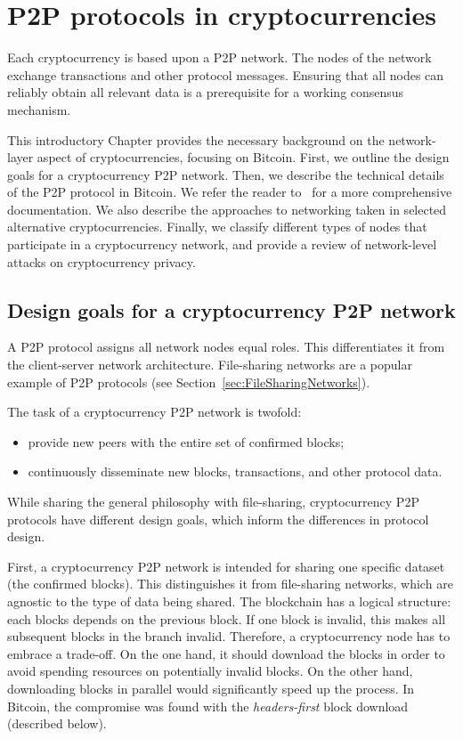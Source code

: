 \chapter{P2P protocols in cryptocurrencies}

\label{Chapter02IntroP2P}

Each cryptocurrency is based upon a P2P network.
The nodes of the network exchange transactions and other protocol messages.
Ensuring that all nodes can reliably obtain all relevant data is a prerequisite for a working consensus mechanism.

This introductory Chapter provides the necessary background on the network-layer aspect of cryptocurrencies, focusing on Bitcoin.
First, we outline the design goals for a cryptocurrency P2P network.
Then, we describe the technical details of the P2P protocol in Bitcoin.
We refer the reader to~\cite{BitcoinWiki, Garay2015} for a more comprehensive documentation.
We also describe the approaches to networking taken in selected alternative cryptocurrencies.
Finally, we classify different types of nodes that participate in a cryptocurrency network, and provide a review of network-level attacks on cryptocurrency privacy.


\section{Design goals for a cryptocurrency P2P network}

A P2P protocol assigns all network nodes equal roles.
This differentiates it from the client-server network architecture.
File-sharing networks are a popular example of P2P protocols (see Section~\ref{sec:FileSharingNetworks}).

The task of a cryptocurrency P2P network is twofold:
\begin{itemize}
	\item provide new peers with the entire set of confirmed blocks;
	\item continuously disseminate new blocks, transactions, and other protocol data.
\end{itemize}

While sharing the general philosophy with file-sharing, cryptocurrency P2P protocols have different design goals, which inform the differences in protocol design.

First, a cryptocurrency P2P network is intended for sharing one specific dataset (the confirmed blocks).
This distinguishes it from file-sharing networks, which are agnostic to the type of data being shared.
The blockchain has a logical structure: each blocks depends on the previous block.
If one block is invalid, this makes all subsequent blocks in the branch invalid.
Therefore, a cryptocurrency node has to embrace a trade-off.
On the one hand, it should download the blocks in order to avoid spending resources on potentially invalid blocks.
On the other hand, downloading blocks in parallel would significantly speed up the process.
In Bitcoin, the compromise was found with the \textit{headers-first} block download (described below).

